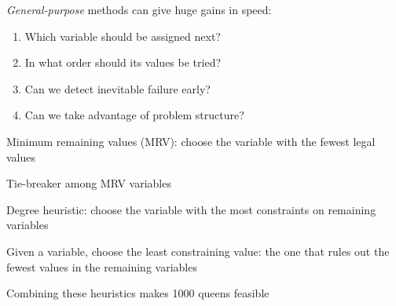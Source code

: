 \documentclass{article}
\begin{document}
\begin{huge}
\maxfigwidth
{}


\emph{General-purpose} methods can give huge gains in speed:
\begin{enumerate}
\item Which variable should be assigned next?
\item In what order should its values be tried?
\item Can we detect inevitable failure early?
\item Can we take advantage of problem structure?
\end{enumerate}


Minimum remaining values (MRV):\al
   choose the variable with the fewest legal values

\vspace*{0.3in}

\maxfigwidth
{}


Tie-breaker among MRV variables

Degree heuristic:\al
   choose the variable with the most constraints on remaining variables

\vspace*{0.3in}

\maxfigwidth
{}


Given a variable, choose the least constraining value:\al
   the one that rules out the fewest values in the remaining variables

\vspace*{0.3in}

\maxfigwidth
{}

Combining these heuristics makes 1000 queens feasible






\end{huge}
\end{document}
